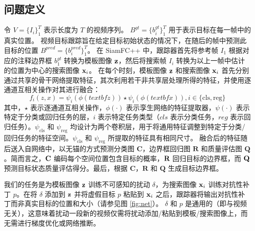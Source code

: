 \subsection{问题定义}
令 $V=\{I_i\}_1^T$ 表示长度为 $T$ 的视频序列。
$B^{gt}=\{b^{gt}_i\}_1^T$ 用于表示目标在每一帧中的真实位置。
视频目标跟踪旨在给定目标初始状态的情况下，在随后的帧中预测此目标的位置 $B^{pred}=\{b^{pred}_i\}_1^T$。
在 SiamFC++ 中，跟踪器首先将参考帧 $I_1$ 根据对应的注释边界框 $b_1^{gt}$ 转换为模板图像 $\textbf z$，然后将搜索帧 $I_i$ 转换为以上一帧中估计的位置为中心的搜索图像 $\textbf x_i$。
在每个时刻，模板图像 $\textbf z$ 和搜索图像 $\textbf x_i$ 首先分别通过共享的骨干网络提取特征，其次利用若干非共享层处理所得的特征，并使用逐通道互相关操作对其进行融合：
\begin{equation}
f_{i}(z, x)=\psi_{i}(\phi(textbf z)) \star \psi_{i}(\phi(textbf x)), i \in\{\mathrm{cls}, \mathrm{reg}\}
\end{equation}
其中，$\star$ 表示逐通道互相关操作，$\phi(\cdot)$ 表示孪生网络的特征提取器，$\psi(\cdot)$ 表示特定于分类或回归任务的层，$i$ 表示特定任务类型（$cls$ 表示分类任务，$reg$ 表示回归任务）。$\psi_{\mathrm{cls}}$ 和 $\psi_{\mathrm{reg}}$ 均设计为两个卷积层，用于将通用特征调整到特定于分类/回归任务的特征空间。$\psi_{\mathrm{cls}}$ 和 $\psi_{\mathrm{reg}}$ 所提取的特征具有相同尺寸。
融合后的特征随后送入自网络中，以无锚的方式预测分类图 $\textbf{C}$，边界框回归图 $\textbf{R}$ 和质量评估图 $\textbf{Q}$。简而言之，$\textbf C$ 编码每个空间位置包含目标的概率，$\textbf R$ 回归目标的边界框，而 $\textbf Q$ 预测目标状态质量评估得分。最后，根据 $\textbf{C}$，$\textbf{R}$ 和 $\textbf{Q}$ 生成目标边界框。

我们的任务是为模板图像 $\textbf z$ 训练不可感知的扰动 $\delta$，为搜索图像 $\textbf x_i$ 训练对抗性补丁 $p$。在将 $\delta$ 添加到 $\textbf z$ 并将虚假目标 $p$ 粘贴到 $\textbf x_i$ 之后，跟踪器将输出对抗性补丁而非真实目标的位置和大小（请参见图 \ref{fig:net}）。
$\delta$ 和 $p$ 是通用的（即与视频无关），这意味着扰动一段新的视频仅需将扰动添加/粘贴到模板/搜索图像上，而无需进行梯度优化或网络推断。

